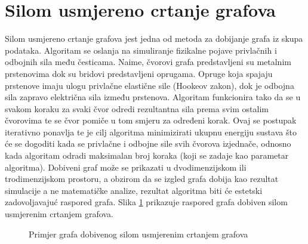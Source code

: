 \documentclass[times, utf8, zavrsni]{fer}
\begin{document}
\section{Silom usmjereno crtanje grafova}
\label{subchap:forcedir}
Silom usmjereno crtanje grafova jest jedna od metoda za dobijanje grafa iz skupa podataka. Algoritam se oslanja na simuliranje fizikalne pojave privlačnih i odbojnih sila među česticama. Naime, čvorovi grafa predstavljeni su metalnim prstenovima dok su bridovi predstavljeni oprugama. Opruge koja spajaju prstenove imaju ulogu privlačne elastične sile (Hookeov zakon), dok je odbojna sila zapravo električna sila između prstenova. Algoritam funkcionira tako da se u svakom koraku za svaki čvor odredi rezultantna sila prema svim ostalim čvorovima te se čvor pomiče u tom smjeru za određeni korak. Ovaj se postupak iterativno ponavlja te je cilj algoritma minimizirati ukupnu energiju sustava što će se dogoditi kada se privlačne i odbojne sile svih čvorova izjednače, odnosno kada algoritam odradi maksimalan broj koraka (koji se zadaje kao parametar algoritma). Dobiveni graf može se prikazati u dvodimenzijskom ili trodimenzijskom prostoru, a obzirom da se izgled grafa dobija kao rezultat simulacije a ne matematičke analize, rezultat algoritma biti će estetski zadovoljavajuć raspored grafa. Slika \ref{img:fdgd_example} prikazuje raspored grafa dobiven silom usmjerenim crtanjem grafova.

\begin{figure}
\caption{Primjer grafa dobivenog silom usmjerenim crtanjem grafova}
\label{img:fdgd_example}
\end{figure}
\end{document}
